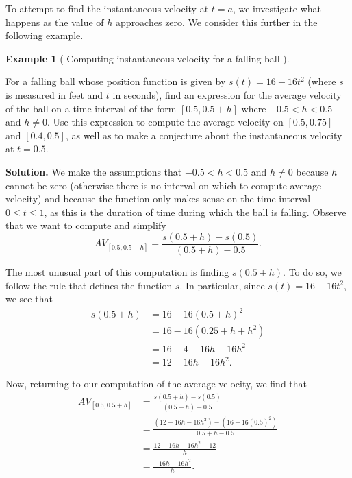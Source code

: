 \documentclass[10pt,]{book}
\theoremstyle{plain}
\theoremstyle{definition}
\theoremstyle{definition}
\theoremstyle{definition}
\newtheorem{example}[theorem]{Example}
\theoremstyle{definition}
\theoremstyle{definition}
\numberwithin{equation}{section}
\newcommand{\lt}{ < }
\newcommand{\amp}{ & }
\begin{document}
To attempt to find the instantaneous velocity at \(t = a\), we investigate what happens as the value of \(h\) approaches zero. We consider this further in the following example.
%
\begin{example}[
    Computing instantaneous velocity for a falling ball
  ]\label{example-1}

  For a falling ball whose position function is given by \(s(t) = 16 - 16t^2\) (where \(s\) is measured in feet and \(t\) in seconds), find an expression for the average velocity of the ball on a time interval of the form \([0.5, 0.5+h]\) where \(-0.5 \lt  h \lt  0.5\) and \(h \ne 0\). Use this expression to compute the average velocity on \([0.5,0.75]\) and \([0.4,0.5]\), as well as to make a conjecture about the instantaneous velocity at \(t = 0.5\).
\par\medskip\noindent%
\textbf{Solution.}\quad 
    We make the assumptions that \(-0.5 \lt  h \lt  0.5\) and \(h \ne 0\) because \(h\) cannot be zero (otherwise there is no interval on which to compute average velocity) and because the function only makes sense on the time interval \(0 \le t \le 1\), as this is the duration of time during which the ball is falling. Observe that we want to compute and simplify
\begin{equation*}
      AV_{[0.5, 0.5+h]} = \frac{s(0.5+h) - s(0.5)}{(0.5+h) - 0.5}.
    \end{equation*}\par

    The most unusual part of this computation is finding \(s(0.5+h)\). To do so, we follow the rule that defines the function \(s\). In particular, since \(s(t) = 16-16t^2\), we see that
\begin{align*}
s(0.5+h) \amp  =  16 - 16(0.5 + h)^2\\
         \amp  =  16 - 16(0.25 + h + h^2)\\
         \amp  =  16 - 4 - 16h - 16h^2\\
         \amp  =  12 - 16h - 16h^2.
\end{align*}\par

    Now, returning to our computation of the average velocity, we find that
\begin{align*}
AV_{[0.5, 0.5+h]} \amp  =  \frac{s(0.5+h) - s(0.5)}{(0.5+h) - 0.5}\\
                  \amp  =  \frac{(12 - 16h - 16h^2) - (16 - 16(0.5)^2)}{0.5 + h - 0.5}\\
                  \amp  =  \frac{12 - 16h - 16h^2 - 12}{h}\\
                  \amp  =  \frac{-16h - 16h^2}{h}.
\end{align*}\par


\end{example}
\end{document}
